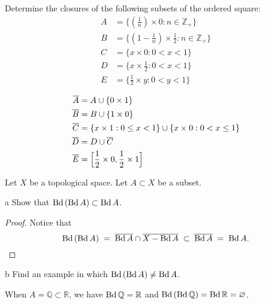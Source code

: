 \documentclass[11pt]{article}
\begin{document}
\begin{ex}{18}
  Determine the closures of the following subsets of the ordered square:
  \begin{align*}
    A &= \{(\frac{1}{n}) \times 0 : n \in \mathbb{Z}_+\} \\
    B &= \{(1 - \frac{1}{n}) \times \frac{1}{2} : n \in \mathbb{Z}_+\} \\
    C &= \{x \times 0 : 0 < x < 1\} \\
    D &= \{x \times \frac{1}{2} : 0 < x < 1\} \\
    E &= \{\frac{1}{2} \times y : 0 < y < 1\}
  \end{align*}
\end{ex}

\begin{solution}
  \begin{align*}
    { \overline{A} } &= A \cup \{0\times1\} \\
    { \overline{B} } &= B \cup \{1 \times 0\} \\
    { \overline{C} } &= \{x \times 1 : 0 \le x < 1\} \cup \{x \times 0 : 0 < x \le 1\}\\
    { \overline{D} } &= D \cup { \overline{C} } \\
    { \overline{E} } &= \Big[\frac{1}{2} \times 0, \frac{1}{2} \times 1\Big]
  \end{align*}
\end{solution}


\noindent Let $X$ be a topological space. Let $A \subset X$ be a subset.

\begin{p}{a}
  Show that ${ \text{Bd}\, } ({ \text{Bd}\, } A) \subset { \text{Bd}\, } A$.
\end{p}
\begin{proof}
  Notice that
  \[ { \text{Bd}\, } ({ \text{Bd}\, } A) \;=\; { \overline{{ \text{Bd}\, } A} } \cap { \overline{X - { \text{Bd}\, }A} } \;\subset\; { \overline{{ \text{Bd}\, } A} }
  \;=\; { \text{Bd}\, } A.\]
\end{proof}

\begin{p}{b}
  Find an example in which ${ \text{Bd}\, } ({ \text{Bd}\, } A) \neq { \text{Bd}\, } A$.
\end{p}
\begin{solution}
  When $A = \mathbb{Q} \subset \mathbb{R}$, we have ${ \text{Bd}\, } \mathbb{Q} = \mathbb{R}$ and
  ${ \text{Bd}\, } ({ \text{Bd}\, } \mathbb{Q}) = { \text{Bd}\, } \mathbb{R} = \varnothing$.
\end{solution}
\end{document}

